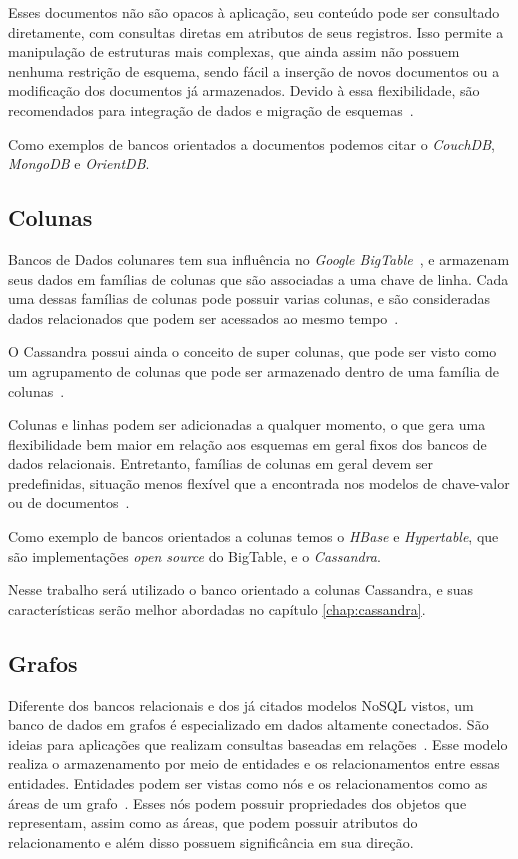 Esses documentos não são opacos à aplicação, seu conteúdo pode ser consultado diretamente, com consultas diretas em atributos de seus registros. Isso permite a manipulação de estruturas mais complexas, que ainda assim não possuem nenhuma restrição de esquema, sendo fácil a inserção de novos documentos ou a modificação dos documentos já armazenados. Devido à essa flexibilidade, são recomendados para integração de dados e migração de esquemas~\cite{nosqleval}. 

Como exemplos de bancos orientados a documentos podemos citar o \emph{CouchDB}, \emph{MongoDB} e \emph{OrientDB}.

\subsection*{Colunas}
Bancos de Dados colunares tem sua influência no \emph{Google BigTable}~\cite{bigtable}, e armazenam seus dados em famílias de colunas que são associadas a uma chave de linha. Cada uma dessas famílias de colunas pode possuir varias colunas, e são consideradas dados relacionados que podem ser acessados ao mesmo tempo~\cite{pramod}. 

O Cassandra possui ainda o conceito de super colunas, que pode ser visto como um agrupamento de colunas que pode ser armazenado dentro de uma família de colunas~\cite{pramod}.

Colunas e linhas podem ser adicionadas a qualquer momento, o que gera uma flexibilidade bem maior em relação aos esquemas em geral fixos dos bancos de dados relacionais.  Entretanto, famílias de colunas em geral devem ser predefinidas, situação menos flexível que a encontrada nos modelos de chave-valor ou de documentos~\cite{nosqleval}.  

Como exemplo de bancos orientados a colunas temos o \emph{HBase} e \emph{Hypertable}, que são implementações \emph{open source} do BigTable, e o \emph{Cassandra}.

Nesse trabalho será utilizado o banco orientado a colunas Cassandra, e suas características serão melhor abordadas no capítulo \ref{chap:cassandra}.


\subsection*{Grafos}
Diferente dos bancos relacionais e dos já citados modelos NoSQL vistos, um banco de dados em grafos é especializado em dados altamente conectados. São ideias para aplicações que realizam consultas baseadas em relações~\cite{nosqleval}.
Esse modelo realiza o armazenamento por meio de entidades e os relacionamentos entre essas entidades. Entidades podem ser vistas como nós e os relacionamentos como as áreas de um grafo~\cite{pramod}. Esses nós podem possuir propriedades dos objetos que representam, assim como as áreas, que podem possuir atributos do relacionamento e além disso possuem significância em sua direção.

